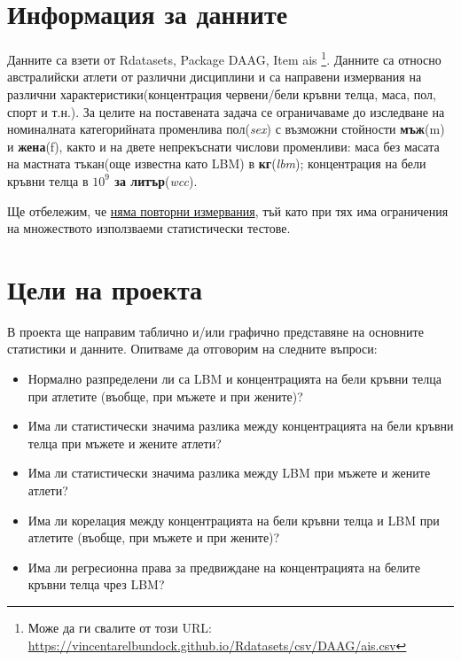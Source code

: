 \documentclass[12pt]{article} %
\begin{document}
\begin{large}

  \tableofcontents
  \thispagestyle{empty}
  \newpage
  \setcounter{page}{1}

  \section{Информация за данните}
  Данните са взети от Rdatasets, Package DAAG, Item ais \footnote{Може да ги свалите от този URL: \url{https://vincentarelbundock.github.io/Rdatasets/csv/DAAG/ais.csv}}. Данните са относно австралийски атлети от различни дисциплини и са направени измервания на различни характеристики(концентрация червени/бели кръвни телца, маса, пол, спорт и т.н.). За целите на поставената задача се ограничаваме до изследване на номиналната категорийната променлива пол(\textit{sex}) с възможни стойности \textbf{мъж}(m) и \textbf{жена}(f), както и на двете непрекъснати числови променливи: маса без масата на мастната тъкан(още известна като LBM) в \textbf{кг}(\textit{lbm}); концентрация на бели кръвни телца в \textbf{$10^9$ за литър}(\textit{wcc}). \par
  Ще отбележим, че \uline{няма повторни измервания}, тъй като при тях има ограничения на множеството използваеми статистически тестове.

  \section{Цели на проекта}

  В проекта ще направим таблично и/или графично представяне на основните статистики и данните. Опитваме да отговорим на следните въпроси:

  \begin{itemize}
    \item Нормално разпределени ли са LBM и концентрацията на бели кръвни телца при атлетите (въобще, при мъжете и при жените)?
    \item Има ли статистически значима разлика между концентрацията на бели кръвни телца при мъжете и жените атлети?
    \item Има ли статистически значима разлика между LBM при мъжете и жените атлети?
    \item Има ли корелация между концентрацията на бели кръвни телца и LBM при атлетите (въобще, при мъжете и при жените)?
    \item Има ли регресионна права за предвиждане на концентрацията на белите кръвни телца чрез LBM?
  \end{itemize}


\end{large}
\end{document}

